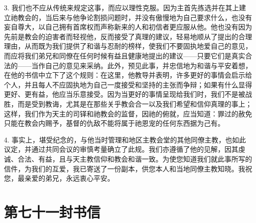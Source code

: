 3. 我们也不应从传统来规定这事，而应以理性克服。因为主首先拣选并在其上建立祂教会的，当后来与他争论割损问题时，并没有傲慢地为自己要求什么，也没有妄自尊大，以自己拥有首席权而声称新来的人和初信者更应服从他。他也没有因为先前是教会的迫害者而轻视他，反而接受了真理的建议，轻易地顺从了提出的合理理由，从而既为我们提供了和谐与忍耐的榜样，使我们不要固执地爱自己的意见，而应将我们弟兄和同僚在任何时候有益且健康地提出的建议——只要它们是真实合法的——当作自己的意见来采纳。此外，预见此事，并忠信地为和谐与平安着想，在他的书信中立下了这个规则：在这里，他教导并表明，许多更好的事情会启示给个人，并且每人不应固执地为自己一度接受和坚持的主张而争辩；如果有什么显得更好、更有益，他应当乐意接受。因为当更好的事情呈现给我们时，我们不是被战胜，而是受到教诲，尤其是在那些关乎教会合一以及我们希望和信仰真理的事上；这样，我们作为天主的司铎和祂教会的监督，因祂的俯就，应当知道：罪过的赦免只能在教会内赐予，基督的仇敌不能将属于祂恩宠的任何东西据为己有。\par

4. 事实上，堪受纪念的，与他当时管理和地区主教会堂的其他同僚主教，也如此议定，并通过共同会议的审慎考量确立了此规。我们亦遵循了他的见解，因其虔诚、合法、有益，且与天主教信仰和教会和谐一致。为使您知道我们就此事所写的信件，为我们的互爱，我已寄送了一份副本，供您本人和当地同僚主教知晓。我祝您，最亲爱的弟兄，永远衷心平安。\par



\section{第七十一封书信}

\par

\par

